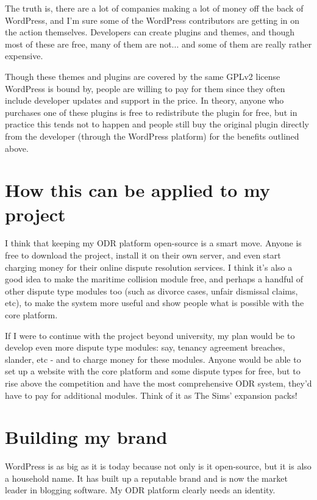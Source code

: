 The truth is, there are a lot of companies making a lot of money off the back of WordPress, and I'm sure some of the WordPress contributors are getting in on the action themselves. Developers can create plugins and themes, and though most of these are free, many of them are not... and some of them are really rather expensive.

Though these themes and plugins are covered by the same GPLv2 license WordPress is bound by, people are willing to pay for them since they often include developer updates and support in the price. In theory, anyone who purchases one of these plugins is free to redistribute the plugin for free, but in practice this tends not to happen and people still buy the original plugin directly from the developer (through the WordPress platform) for the benefits outlined above.

\section{How this can be applied to my project}

I think that keeping my ODR platform open-source is a smart move. Anyone is free to download the project, install it on their own server, and even start charging money for their online dispute resolution services. I think it's also a good idea to make the maritime collision module free, and perhaps a handful of other dispute type modules too (such as divorce cases, unfair dismissal claims, etc), to make the system more useful and show people what is possible with the core platform.

If I were to continue with the project beyond university, my plan would be to develop even more dispute type modules: say, tenancy agreement breaches, slander, etc - and to charge money for these modules. Anyone would be able to set up a website with the core platform and some dispute types for free, but to rise above the competition and have the most comprehensive ODR system, they'd have to pay for additional modules. Think of it as The Sims' expansion packs!

\section{Building my brand}

WordPress is as big as it is today because not only is it open-source, but it is also a household name. It has built up a reputable brand and is now the market leader in blogging software. My ODR platform clearly needs an identity.

